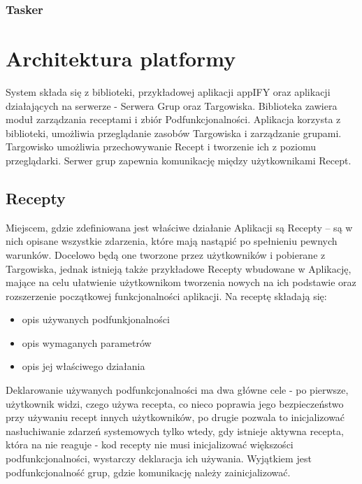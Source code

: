 \documentclass[11pt,a4paper,polish,thesis]{dcsbook}
\begin{document}
\subsection{Tasker}

\chapter{Architektura platformy}
System składa się z biblioteki, przykładowej aplikacji appIFY oraz aplikacji działających na serwerze - Serwera Grup oraz Targowiska.
Biblioteka zawiera moduł zarządzania receptami i zbiór Podfunkcjonalności.
Aplikacja korzysta z biblioteki, umożliwia przeglądanie zasobów Targowiska i zarządzanie grupami. 
Targowisko umożliwia przechowywanie Recept i tworzenie ich z poziomu przeglądarki.
Serwer grup zapewnia komunikację między użytkownikami Recept.


\section{Recepty}
Miejscem, gdzie zdefiniowana jest właściwe działanie Aplikacji są Recepty -- są w nich opisane wszystkie zdarzenia, które mają nastąpić po spełnieniu pewnych warunków. Docelowo będą one tworzone przez użytkowników i pobierane z Targowiska, jednak istnieją także przykładowe Recepty wbudowane w Aplikację, mające na celu ułatwienie użytkownikom tworzenia nowych na ich podstawie oraz rozszerzenie początkowej funkcjonalności aplikacji. 
Na receptę składają się:
\begin{itemize}
\item  opis używanych podfunkjonalności
\item  opis wymaganych parametrów
\item  opis jej właściwego działania
\end{itemize}
Deklarowanie używanych podfunkcjonalności ma dwa główne cele - po pierwsze, użytkownik widzi, czego używa recepta, co nieco poprawia jego bezpieczeństwo przy używaniu recept innych użytkowników, po drugie pozwala to inicjalizować nasłuchiwanie zdarzeń systemowych tylko wtedy, gdy istnieje aktywna recepta, która na nie reaguje - kod recepty nie musi inicjalizować większości podfunkcjonalności, wystarczy deklaracja ich używania. Wyjątkiem jest podfunkcjonalność grup, gdzie komunikację należy zainicjalizować.
\end{document}
